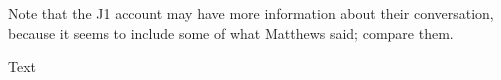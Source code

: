 				
				Note that the J1 account may have more information about their conversation, because it seems to include some of what Matthews said; compare them.
			
			\begin{description}
				\item[Text]
			\end{description}
			
